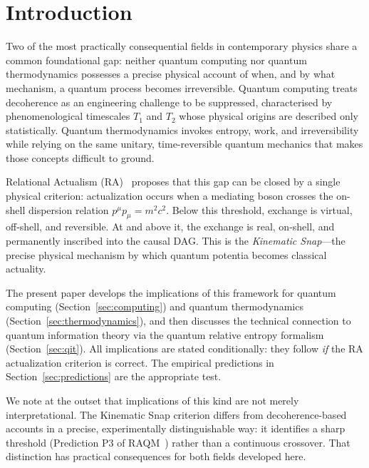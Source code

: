 \documentclass[11pt,a4paper]{article}
\theoremstyle{plain}
\theoremstyle{definition}
\theoremstyle{remark}
\begin{document}
\section{Introduction}
\label{sec:intro}

Two of the most practically consequential fields in contemporary physics share a
common foundational gap: neither quantum computing nor quantum thermodynamics
possesses a precise physical account of when, and by what mechanism, a quantum
process becomes irreversible. Quantum computing treats decoherence as an
engineering challenge to be suppressed, characterised by phenomenological
timescales $T_1$ and $T_2$ whose physical origins are described only
statistically. Quantum thermodynamics invokes entropy, work, and irreversibility
while relying on the same unitary, time-reversible quantum mechanics that makes
those concepts difficult to ground.

Relational Actualism (RA)~\citep{Sandeman2026a,Sandeman2026RAGC,Sandeman2026RACI}
proposes that this gap can be closed by a single physical criterion: actualization
occurs when a mediating boson crosses the on-shell dispersion relation
$p^\mu p_\mu = m^2c^2$. Below this threshold, exchange is virtual, off-shell,
and reversible. At and above it, the exchange is real, on-shell, and permanently
inscribed into the causal DAG. This is the \emph{Kinematic Snap}---the precise
physical mechanism by which quantum potentia becomes classical actuality.

The present paper develops the implications of this framework for quantum computing
(Section~\ref{sec:computing}) and quantum thermodynamics
(Section~\ref{sec:thermodynamics}), and then discusses the technical connection
to quantum information theory via the quantum relative entropy formalism
(Section~\ref{sec:qit}). All implications are stated conditionally: they follow
\emph{if} the RA actualization criterion is correct. The empirical predictions
in Section~\ref{sec:predictions} are the appropriate test.

We note at the outset that implications of this kind are not merely
interpretational. The Kinematic Snap criterion differs from decoherence-based
accounts in a precise, experimentally distinguishable way: it identifies a sharp
threshold (Prediction P3 of RAQM~\citep{Sandeman2026a}) rather than a continuous
crossover. That distinction has practical consequences for both fields developed
here.

\end{document}

